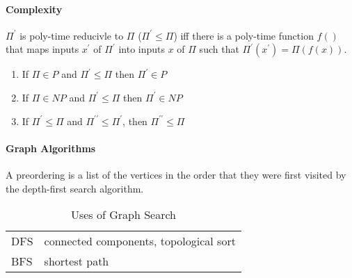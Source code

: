 \documentclass[10pt,letterpaper]{article}
\begin{document}
\paragraph{Complexity} $\Pi^\prime$ is poly-time reducivle to $\Pi$ ($\Pi^\prime \leq \Pi$) iff there is a poly-time function $f()$ that maps inputs $x^\prime$ of $\Pi^\prime$ into inputs $x$ of $\Pi$ such that $\Pi^\prime(x^\prime)=\Pi(f(x))$. 
\begin{enumerate}
 \item If $\Pi \in P$ and $\Pi^\prime \leq \Pi$ then $\Pi^\prime \in P$
 \item If $\Pi \in NP$ and $\Pi^\prime \leq \Pi$ then $\Pi^\prime \in NP$
 \item If $\Pi^\prime \leq \Pi$ and $\Pi^{\prime \prime} \leq \Pi^\prime$, then $\Pi^{\prime \prime} \leq \Pi$
\end{enumerate} 

\paragraph{Graph Algorithms} 

A preordering is a list of the vertices in the order that they were first visited by the depth-first search algorithm. 

\begin{table}[h!]
\caption{Uses of Graph Search}
\begin{center}
\begin{tabular}{ll}
DFS & connected components, topological sort \\
BFS & shortest path
\end{tabular}
\end{center}
\end{table}



\end{document}
